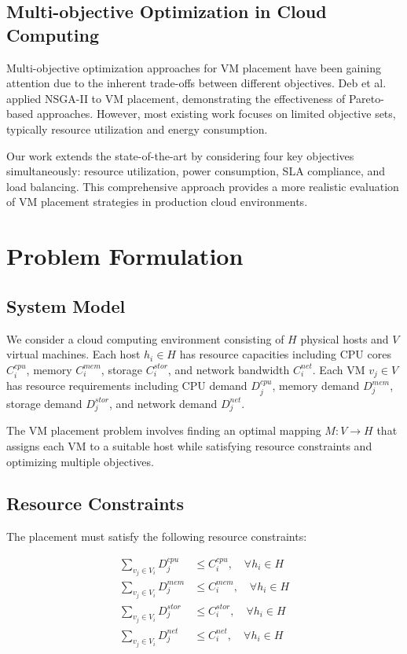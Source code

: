 \documentclass[conference]{IEEEtran}
\begin{document}
\subsection{Multi-objective Optimization in Cloud Computing}

Multi-objective optimization approaches for VM placement have been gaining attention due to the inherent trade-offs between different objectives. Deb et al. \cite{nsga2014} applied NSGA-II to VM placement, demonstrating the effectiveness of Pareto-based approaches. However, most existing work focuses on limited objective sets, typically resource utilization and energy consumption.

Our work extends the state-of-the-art by considering four key objectives simultaneously: resource utilization, power consumption, SLA compliance, and load balancing. This comprehensive approach provides a more realistic evaluation of VM placement strategies in production cloud environments.

\section{Problem Formulation}

\subsection{System Model}

We consider a cloud computing environment consisting of $H$ physical hosts and $V$ virtual machines. Each host $h_i \in H$ has resource capacities including CPU cores $C_i^{cpu}$, memory $C_i^{mem}$, storage $C_i^{stor}$, and network bandwidth $C_i^{net}$. Each VM $v_j \in V$ has resource requirements including CPU demand $D_j^{cpu}$, memory demand $D_j^{mem}$, storage demand $D_j^{stor}$, and network demand $D_j^{net}$.

The VM placement problem involves finding an optimal mapping $M: V \rightarrow H$ that assigns each VM to a suitable host while satisfying resource constraints and optimizing multiple objectives.

\subsection{Resource Constraints}

The placement must satisfy the following resource constraints:

\begin{align}
\sum_{v_j \in V_i} D_j^{cpu} &\leq C_i^{cpu}, \quad \forall h_i \in H \\
\sum_{v_j \in V_i} D_j^{mem} &\leq C_i^{mem}, \quad \forall h_i \in H \\
\sum_{v_j \in V_i} D_j^{stor} &\leq C_i^{stor}, \quad \forall h_i \in H \\
\sum_{v_j \in V_i} D_j^{net} &\leq C_i^{net}, \quad \forall h_i \in H
\end{align}
\end{document}
